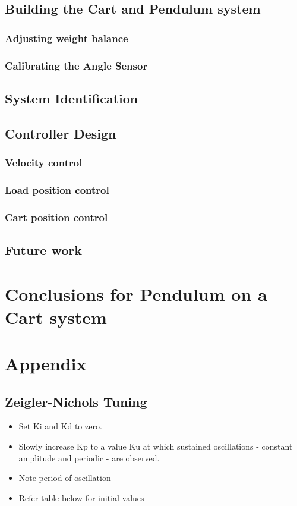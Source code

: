 \documentclass[paper=a4, fontsize=11pt]{scrartcl}
\numberwithin{equation}{section}        %
\numberwithin{figure}{section}          %
\numberwithin{table}{section}           %
\begin{document}
\subsection{Building the Cart and Pendulum system}

\subsubsection{Adjusting weight balance}

\subsubsection{Calibrating the Angle Sensor}

\subsection{System Identification}

\subsection{Controller Design}

\subsubsection{Velocity control}

\subsubsection{Load position control}

\subsubsection{Cart position control}

\subsection{Future work}

\section{Conclusions for Pendulum on a Cart system}

\section{Appendix}
\subsection{Zeigler-Nichols Tuning}
\begin{itemize}
\item Set Ki and Kd to zero.
\item Slowly increase Kp to a value Ku at which sustained oscillations - constant amplitude and periodic - are observed.
\item Note period of oscillation
\item Refer table below for initial values
\end{itemize}
\end{document}
